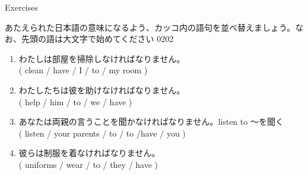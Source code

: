 \documentclass[aspectratio=169,xcolor={dvipsnames,table}]{beamer}
\newcommand{\myaudio}[1]{\href{#1}{\faVolumeUp}}
\begin{document}
\begin{frame}[plain]{Exercises}

{\small あたえられた日本語の意味になるよう、カッコ内の語句を並べ替えましょう。なお、先頭の語は大文字で始めてください}%
\hfill{\tiny 0202}\,{\scriptsize \myaudio{./audio/014_have_to_02.mp3}}
\begin{enumerate}
 \item わたしは部屋を掃除しなければなりません。\\
( clean / have / I / to / my room )\hspace{20pt}
 \item わたしたちは彼を助けなければなりません。\\
( help / him / to / we / have )\hspace{20pt}
 \item あなたは両親の言うことを聞かなければなりません。\hfill{\scriptsize listen to ～を聞く}\\
( listen / your parents / to / to /have / you )\\
 \item 彼らは制服を着なければなりません。
\\
( uniforms / wear / to / they / have )\hspace{20pt}
\\%
\hfill{}
\end{enumerate} 
\end{frame}
\end{document}
